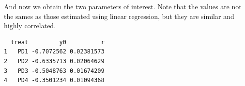 \documentclass[
  letterpaper,
]{book}
\newenvironment{Shaded}{\begin{snugshade}}{\end{snugshade}}
\newcommand{\FunctionTok}[1]{\textcolor[rgb]{0.28,0.35,0.67}{#1}}
\newcommand{\NormalTok}[1]{\textcolor[rgb]{0.00,0.23,0.31}{#1}}
\newcommand{\SpecialCharTok}[1]{\textcolor[rgb]{0.37,0.37,0.37}{#1}}
\newcommand{\StringTok}[1]{\textcolor[rgb]{0.13,0.47,0.30}{#1}}
\begin{document}
And now we obtain the two parameters of interest. Note that the values
are not the sames as those estimated using linear regression, but they
are similar and highly correlated.

\begin{Shaded}
\end{Shaded}

\begin{verbatim}
  treat         y0          r
1   PD1 -0.7072562 0.02381573
2   PD2 -0.6335713 0.02064629
3   PD3 -0.5048763 0.01674209
4   PD4 -0.3501234 0.01094368
\end{verbatim}
\end{document}
